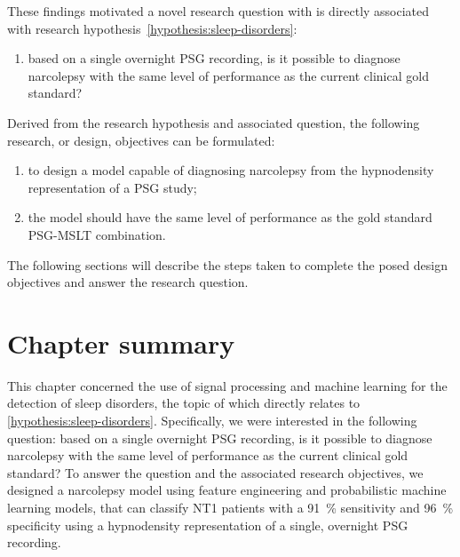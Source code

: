 These findings motivated a novel research question with is directly associated with research hypothesis~\ref{hypothesis:sleep-disorders}: 
\newcommand{\questionSleepDisorders}{based on a single overnight \ac{PSG} recording, is it possible to diagnose narcolepsy with the same level of performance as the current clinical gold standard?}
\begin{enumerate}[label={\footnotesize\bfseries\scshape RQ~\arabic*}, ref={\bfseries\scshape RQ~\arabic*}]
    \item \questionSleepDisorders\label{question:sleep-disorders}
\end{enumerate}

Derived from the research hypothesis and associated question, the following research, or design, objectives can be formulated:

\begin{enumerate}[label=(\roman*)]
    \item to design a model capable of diagnosing narcolepsy from the hypnodensity representation of a \ac{PSG} study;
    \item the model should have the same level of performance as the gold standard \ac{PSG}-\ac{MSLT} combination.
\end{enumerate}

The following sections will describe the steps taken to complete the posed design objectives and answer the research question.



\section{Chapter summary}

This chapter concerned the use of signal processing and machine learning for the detection of sleep disorders, the topic of which directly relates to \ref{hypothesis:sleep-disorders}\graffito{\hypothesisSleepDisorders}.
Specifically, we were interested in the following question: \questionSleepDisorders
To answer the question and the associated research objectives, we designed a narcolepsy model using feature engineering and probabilistic machine learning models, that can classify \ac{NT1} patients with a \SI{91}{\percent} sensitivity and \SI{96}{\percent} specificity using a hypnodensity representation of a single, overnight \ac{PSG} recording.